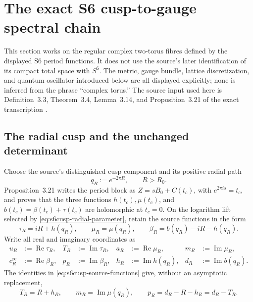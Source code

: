 \section{The exact S6 cusp-to-gauge spectral chain}
\label{sec:s6-cusp-gauge-spectral-chain}

This section works on the regular complex two-torus fibres defined by the
displayed S6 period functions.  It does not use the source's later
identification of its compact total space with \(S^6\).  The metric, gauge
bundle, lattice discretization, and quantum oscillator introduced below are
all displayed explicitly; none is inferred from the phrase ``complex
torus.''  The source input used here is Definition~3.3, Theorem~3.4,
Lemma~3.14, and Proposition~3.21 of the exact transcription
\cite{S6Internal}.

\subsection{The radial cusp and the unchanged determinant}

Choose the source's distinguished cusp component and its positive radial
path
\begin{equation}\label{eq:s6cusp-radial-parameter}
 q_R:=e^{-2\pi R},\qquad R>R_0.
\end{equation}
Proposition~3.21 writes the period block as
\(Z=sB_0+C(t_c)\), with \(e^{2\pi i s}=t_c\), and proves that the three
functions \(h(t_c),\mu(t_c)\), and \(b(t_c)=\beta(t_c)+\tau(t_c)\) are
holomorphic at \(t_c=0\).  On the logarithm lift selected by
\eqref{eq:s6cusp-radial-parameter}, retain the source functions in the form
\begin{equation}\label{eq:s6cusp-source-functions}
 \tau_R=iR+h(q_R),\qquad
 \mu_R=\mu(q_R),\qquad
 \beta_R=b(q_R)-iR-h(q_R).
\end{equation}
Write all real and imaginary coordinates as
\begin{align}
 u_R&:=\operatorname{Re}\tau_R,
 &T_R&:=\operatorname{Im}\tau_R,
 &a_R&:=\operatorname{Re}\mu_R,
 &m_R&:=\operatorname{Im}\mu_R,\label{eq:s6cusp-real-imag-one}\\
 c_R^{\mathrm{re}}&:=\operatorname{Re}\beta_R,
 &p_R&:=\operatorname{Im}\beta_R,
 &h_R&:=\operatorname{Im}h(q_R),
 &d_R&:=\operatorname{Im}b(q_R).
 \label{eq:s6cusp-real-imag-two}
\end{align}
The identities in \eqref{eq:s6cusp-source-functions} give, without an
asymptotic replacement,
\begin{equation}\label{eq:s6cusp-imaginary-identities}
 T_R=R+h_R,\qquad m_R=\operatorname{Im}\mu(q_R),\qquad
 p_R=d_R-R-h_R=d_R-T_R.
\end{equation}

